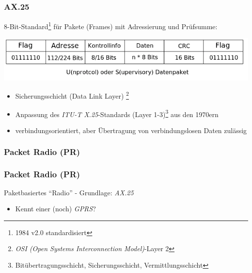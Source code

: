 \begin{frame}
    \frametitle{AX.25}

    8-Bit-Standard\footnote{1984 v2.0 standardisiert} für Pakete (Frames) mit Adressierung und Prüfsumme:

    \begin{center}
        \includegraphics[width=1\textwidth]{e16/Ax25-US-Paket.png}
        \tiny \hyperlink{refs}{\cite{wc}}
    \end{center}

    \begin{itemize}
        \item Sicherungsschicht (Data Link Layer)
              \footnote{\emph{OSI (Open Systems Interconnection Model)}-Layer 2}
        \item Anpassung des  \emph{ITU-T X.25}-Standards (Layer
              1-3)\footnote{Bitübertragungsschicht, Sicherungsschicht,
              Vermittlungsschicht} aus den 1970ern
        \item verbindungsorientiert, aber Übertragung von verbindungslosen Daten zulässig
    \end{itemize}

\end{frame}

\subsubsection {Packet Radio (PR)}

\begin{frame}
    \frametitle{Packet Radio (PR)}

    Paketbasiertes ``Radio'' - Grundlage: \emph{AX.25}
        
    \begin{itemize}
        \item Kennt einer (noch) \emph{GPRS}?
    \end{itemize}
   
\end{frame}

